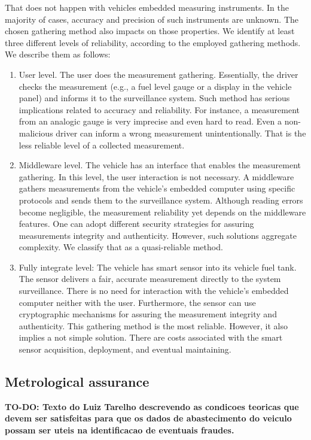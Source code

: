 \documentclass[sigplan]{acmart}
\begin{document}
That does not happen with vehicles embedded measuring instruments.
In the majority of cases, accuracy and precision of such instruments are unknown.
The chosen gathering method also impacts on those properties.
We identify at least three different levels of reliability, according to the employed gathering methods.
We describe them as follows:
\begin{enumerate}
 \item User level. The user does the measurement gathering. 
  Essentially, the driver checks the measurement (e.g., a fuel level gauge or a display in the vehicle panel) and informs it to the surveillance system. 
  Such method has serious implications related to accuracy and reliability.
  For instance, a measurement from an analogic gauge is very imprecise and even hard to read.
  Even a non-malicious driver can inform a wrong measurement unintentionally.
  That is the less reliable level of a collected measurement.
  \item Middleware level. The vehicle has an interface that enables the measurement gathering.
  In this level, the user interaction is not necessary.
  A middleware gathers measurements from the vehicle's embedded computer using specific protocols and sends them to the surveillance system.
  Although reading errors become negligible,  the measurement reliability yet depends on the middleware features.
  One can adopt different security strategies for assuring measurements integrity and authenticity.
  However, such solutions aggregate complexity.
  We classify that as a quasi-reliable method.
  \item Fully integrate level: The vehicle has smart sensor into its vehicle fuel tank.
  The sensor delivers a fair, accurate measurement directly to the system surveillance.
  There is no need for interaction with the vehicle's embedded computer neither with the user.
  Furthermore, the sensor can use cryptographic mechanisms for assuring the measurement integrity and authenticity.
  This gathering method is the most reliable.
  However, it also implies a not simple solution.
  There are costs associated with the smart sensor acquisition,  deployment, and eventual maintaining.\end{enumerate}


\subsection{Metrological assurance}
\textbf{TO-DO: Texto do Luiz Tarelho descrevendo as condicoes teoricas que devem ser satisfeitas para que os dados de abastecimento do veiculo possam ser uteis na identificacao de eventuais fraudes.
}
\end{document}
